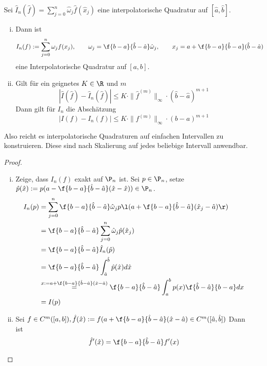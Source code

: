 \documentclass[11pt]{scrbook}
\begin{document}
\begin{st}[Koordinatentransformation]
	\label{2.8}
	Sei $\hat I_n(\hat f) = \sum_{j=0}^n \hat \omega_j \hat f(\hat x_j)$ eine interpolatorische Quadratur auf $[\hat a, \hat b]$.
	\begin{enumerate}[i)]
		\item
			Dann ist
			\[
				I_n(f) := \sum_{j=0}^n \omega_j f(x_j), \qquad \omega_j = \f{b-a}{\hat b - \hat a}\hat \omega_j, \qquad x_j =a + \f{b-a}{\hat b -a}(\hat b - \hat a)
			\]
			eine Interpolatorische Quadratur auf $[a,b]$.
		\item
			Gilt für ein geignetes $K\in \R$ und $m$
			\[
				|\hat I(\hat f) - \hat I_n(\hat f) | \le K \cdot \|\hat f^{(m)}\|_\infty \cdot (\hat b - \hat a)^{m+1}
			\]
			Dann gilt für $I_n$ die Abschätzung
			\[
				|I(f) - I_n(f)| \le K \cdot \|f^{(m)}\|_\infty \cdot (b-a)^{m+1}
			\]
	\end{enumerate}
	\begin{note}
		Also reicht es interpolatorische Quadraturen auf einfachen Intervallen zu konstruieren.
		Diese sind nach Skalierung auf jedes beliebige Intervall anwendbar.
	\end{note}
	\begin{proof}
		\begin{enumerate}[i)]
			\item
				Zeige, dass $I_n(f)$ exakt auf $\P_n$ ist.
				Sei $p\in \P_n$, setze $\hat p(\hat x) := p(a- \f {b-a}{\hat b- \hat a}(\hat x- \hat x)) \in \P_n$.
				\begin{align*}
					I_n(p) 
					&= \sum_{j=0}^{n} \f {b-a}{\hat b - \hat a} \hat \omega_j p\l(a + \f {b-a}{\hat b - \hat a}(\hat x_j - \hat a)\r) \\
					&=\f {b-a}{\hat b - \hat a}\sum_{j=0}^n \hat \omega_j \hat p(\hat x_j) \\
					&= \f {b-a}{\hat b - \hat a}\hat I_n(\hat p) \\
					&= \f {b-a}{\hat b - \hat a}\int_{\hat a}^{\hat b}\hat p(\hat x) d\hat x \\
					&\stackrel{x:= a+ \f{b-a}{\hat b - \hat a}(\hat x - \hat a)} = \f {b-a}{\hat b - \hat a} \int_a^b p(x) \f {\hat b - \hat a}{b-a} dx \\
					&= I(p)
				\end{align*}
			\item
				Sei $f\in C^m([a,b]), \hat f(\hat x) := f(a + \f {b-a}{\hat b - \hat a}(\hat x - \hat a) \in C^m([\hat a,\hat b])$
				Dann ist
				\begin{align*}
					\hat f'(\hat x) &= \f {b-a}{\hat b - \hat a}f'(x) \\

\end{align*}
\end{enumerate}
\end{proof}
\end{st}
\end{document}
